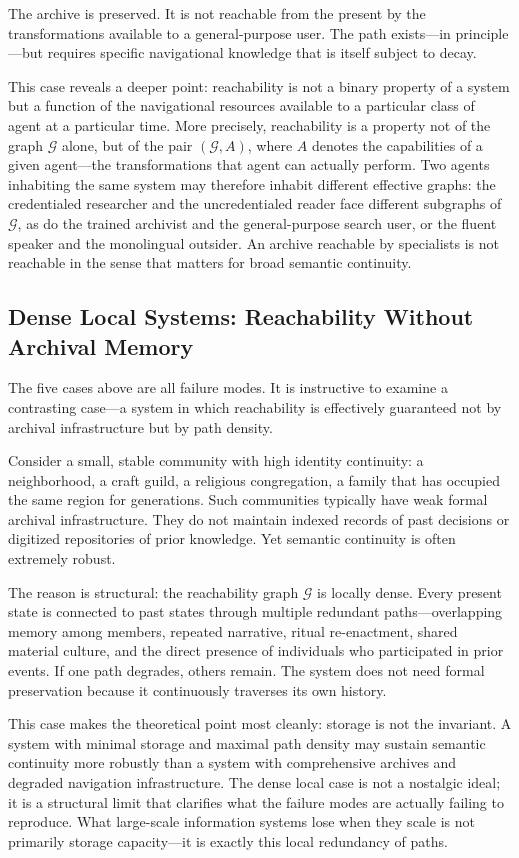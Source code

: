 \documentclass[12pt]{article}
\newcommand{\sG}{\mathcal{G}}
\begin{document}
The archive is preserved.
It is not reachable from the present by the transformations available to a
general-purpose user.
The path exists---in principle---but requires specific navigational knowledge
that is itself subject to decay.

This case reveals a deeper point: reachability is not a binary property of
a system but a function of the navigational resources available to a
particular class of agent at a particular time.
More precisely, reachability is a property not of the graph $\sG$ alone,
but of the pair $(\sG, A)$, where $A$ denotes the capabilities of a given
agent---the transformations that agent can actually perform.
Two agents inhabiting the same system may therefore inhabit different
effective graphs: the credentialed researcher and the uncredentialed reader
face different subgraphs of $\sG$, as do the trained archivist and the
general-purpose search user, or the fluent speaker and the monolingual
outsider.
An archive reachable by specialists is not reachable in the sense that
matters for broad semantic continuity.

\subsection{Dense Local Systems: Reachability Without Archival Memory}

The five cases above are all failure modes.
It is instructive to examine a contrasting case---a system in which
reachability is effectively guaranteed not by archival infrastructure
but by path density.

Consider a small, stable community with high identity continuity: a
neighborhood, a craft guild, a religious congregation, a family that has
occupied the same region for generations.
Such communities typically have weak formal archival infrastructure.
They do not maintain indexed records of past decisions or digitized
repositories of prior knowledge.
Yet semantic continuity is often extremely robust.

The reason is structural: the reachability graph $\sG$ is locally dense.
Every present state is connected to past states through multiple redundant
paths---overlapping memory among members, repeated narrative, ritual
re-enactment, shared material culture, and the direct presence of
individuals who participated in prior events.
If one path degrades, others remain.
The system does not need formal preservation because it continuously
traverses its own history.

This case makes the theoretical point most cleanly: storage is not the
invariant.
A system with minimal storage and maximal path density may sustain semantic
continuity more robustly than a system with comprehensive archives and
degraded navigation infrastructure.
The dense local case is not a nostalgic ideal; it is a structural limit
that clarifies what the failure modes are actually failing to reproduce.
What large-scale information systems lose when they scale is not primarily
storage capacity---it is exactly this local redundancy of paths.
\end{document}
